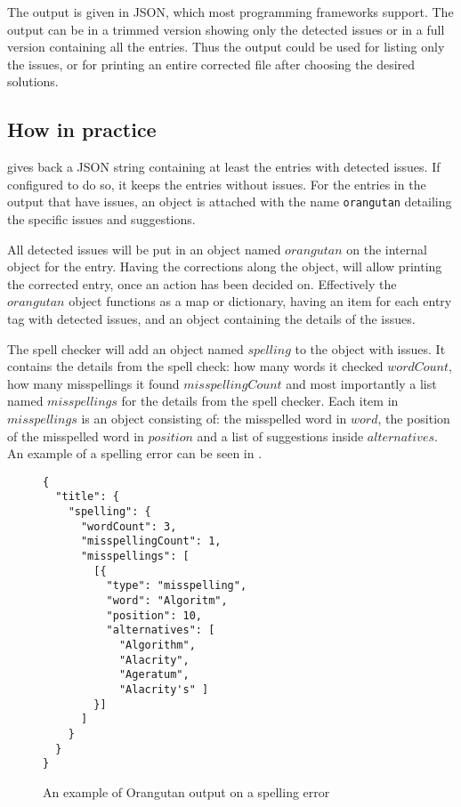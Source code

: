 The output is given in JSON, which most programming frameworks
support.  The output can be in a trimmed version showing only the
detected issues or in a full version containing all the entries.  Thus
the output could be used for listing only the issues, or for printing
an entire corrected {\bibtex} file after choosing the desired
solutions.


\subsection{How in practice}
\label{sec:organizing_orangutan_how_practice}

{\orangutan} gives back a JSON string containing at least the entries
with detected issues.  If configured to do so, it keeps the entries
without issues.  For the entries in the output that have issues, an
object is attached with the name \texttt{orangutan} detailing the
specific issues and suggestions.

All detected issues will be put in an object named $orangutan$ on the
internal object for the entry.  Having the corrections along the
object, will allow printing the corrected entry, once an action has
been decided on.  Effectively the $orangutan$ object functions as a
map or dictionary, having an item for each entry tag with detected
issues, and an object containing the details of the issues.

The spell checker will add an object named $spelling$ to the object
with issues.  It contains the details from the spell check: how many
words it checked $wordCount$, how many misspellings it found
$misspellingCount$ and most importantly a list named $misspellings$
for the details from the spell checker.  Each item in $misspellings$
is an object consisting of: the misspelled word in $word$, the
position of the misspelled word in $position$ and a list of
suggestions inside $alternatives$.  An example of a spelling error can
be seen in .

\begin{figure}
  \centering
\begin{verbatim}
{
  "title": {
    "spelling": {
      "wordCount": 3,
      "misspellingCount": 1,
      "misspellings": [
        [{
          "type": "misspelling",
          "word": "Algoritm",
          "position": 10,
          "alternatives": [
            "Algorithm",
            "Alacrity",
            "Ageratum",
            "Alacrity's" ]
        }]
      ]
    }
  }
}
\end{verbatim}
\caption{An example of Orangutan output on a spelling error}
\label{fig:orgazing_misspelling_output}
\end{figure}

